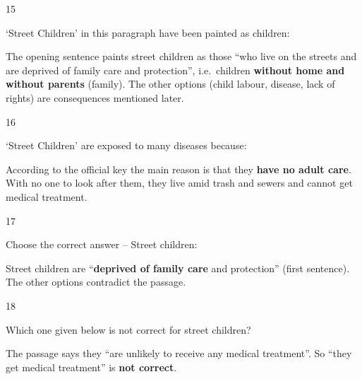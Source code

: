\begin{question}{15}
{`Street Children' in this paragraph have been painted as children:\par}
\begin{explain}
The opening sentence paints street children as those ``who live on the streets and are deprived of family care and protection'', i.e.\ children \textbf{without home and without parents} (family). The other options (child labour, disease, lack of rights) are consequences mentioned later.
\end{explain}
\end{question}

\begin{question}{16}
{`Street Children' are exposed to many diseases because:\par}
\begin{explain}
According to the official key the main reason is that they \textbf{have no adult care}. With no one to look after them, they live amid trash and sewers and cannot get medical treatment.
\end{explain}
\end{question}

\begin{question}{17}
{Choose the correct answer -- Street children:\par}
\begin{explain}
Street children are ``\textbf{deprived of family care} and protection'' (first sentence). The other options contradict the passage.
\end{explain}
\end{question}

\begin{question}{18}
{Which one given below is not correct for street children?\par}
\begin{explain}
The passage says they ``are unlikely to receive any medical treatment''. So ``they get medical treatment'' is \textbf{not correct}.
\end{explain}
\end{question}

